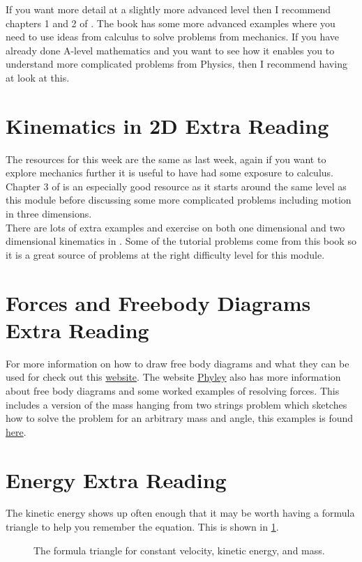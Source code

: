 \documentclass[a4paper,12pt]{book}
\begin{document}
If you want more detail at a slightly more advanced level then I recommend chapters 1 and 2 of \citep{YandF2019}. The book \citep{mansfield2020understanding} has some more advanced examples where you need to use ideas from calculus to solve problems from mechanics. If you have already done A-level mathematics and you want to see how it enables you to understand more complicated problems from Physics, then I recommend having at look at this.\\


\section{Kinematics in 2D Extra Reading}
The resources for this week are the same as last week, again if you want to explore mechanics further it is useful to have had some exposure to calculus. Chapter 3 of \citep{YandF2019} is an especially good resource as it starts around the same level as this module before discussing some more complicated problems including motion in three dimensions. \\

There are lots of extra examples and exercise on both one dimensional and two dimensional kinematics in \citep{sadler1996understanding}. Some of the tutorial problems come from this book so it is a great source of problems at the right difficulty level for this module. 

\section{Forces and Freebody Diagrams Extra Reading}
For more information on how to draw free body diagrams and what they can be used for check out this \href{https://www.physicsclassroom.com/class/newtlaws/Lesson-2/Drawing-Free-Body-Diagrams}{website}. The website \href{https://www.phyley.com/}{Phyley} also has more information about free  body diagrams and some worked examples of resolving forces. This includes a version of the mass hanging from two strings problem which sketches how to solve the problem for an arbitrary mass and angle, this examples is found \href{https://www.phyley.com/mass-hanging-from-two-ropes}{here}.

\section{Energy Extra Reading}
The kinetic energy shows up often enough that it may be worth having a formula triangle to help you remember the equation. This is shown in \cref{fig: Kmv triangle}.\\
\begin{figure}[ht]
    \centering
    \large {}
    \caption{The formula triangle for constant velocity, kinetic energy, and mass. }
    \label{fig: Kmv triangle}
\end{figure}
\end{document}
